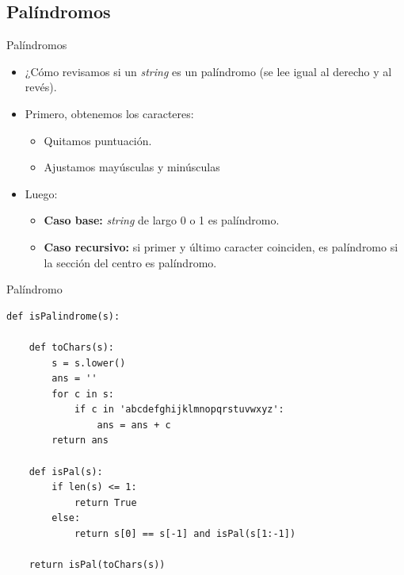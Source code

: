 \documentclass[mathserif]{beamer}
\begin{document}
\subsection{Palíndromos}
\begin{frame}[fragile]{Palíndromos}
    \begin{itemize}
        \item ¿Cómo revisamos si un \textit{string} es un palíndromo (se lee igual al derecho y al revés).
        
        \item Primero, obtenemos los caracteres: 
        \begin{itemize}
            \item Quitamos puntuación.
            \item Ajustamos mayúsculas y minúsculas
        \end{itemize}
        
        \item Luego: 
        \begin{itemize}
            \item {\orange\bfseries Caso base:} \textit{string} de largo 0 o 1 es palíndromo.
            \item {\orange\bfseries Caso recursivo:} si primer y último caracter coinciden, es palíndromo si la sección del centro es palíndromo.
        \end{itemize}
    \end{itemize}
\end{frame}


\begin{frame}[fragile]{Palíndromo}

\begin{lstlisting}
def isPalindrome(s):

    def toChars(s):
        s = s.lower()
        ans = ''
        for c in s:
            if c in 'abcdefghijklmnopqrstuvwxyz':
                ans = ans + c
        return ans

    def isPal(s):
        if len(s) <= 1:
            return True
        else:
            return s[0] == s[-1] and isPal(s[1:-1])

    return isPal(toChars(s))
\end{lstlisting}
\end{frame}
\end{document}
